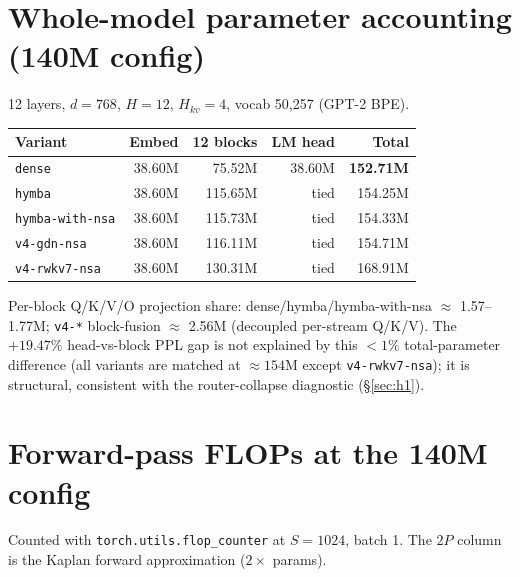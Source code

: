 
\section{Whole-model parameter accounting (140M config)}
\label{app:params}
12 layers, $d{=}768$, $H{=}12$, $H_{kv}{=}4$, vocab 50{,}257 (GPT-2 BPE).

\begin{center}
\begin{tabular}{lrrrr}
\toprule
Variant & Embed & 12 blocks & LM head & Total \\
\midrule
\texttt{dense} & 38.60M & 75.52M & 38.60M & \textbf{152.71M} \\
\texttt{hymba} & 38.60M & 115.65M & tied & 154.25M \\
\texttt{hymba-with-nsa} & 38.60M & 115.73M & tied & 154.33M \\
\texttt{v4-gdn-nsa} & 38.60M & 116.11M & tied & 154.71M \\
\texttt{v4-rwkv7-nsa} & 38.60M & 130.31M & tied & 168.91M \\
\bottomrule
\end{tabular}
\end{center}

Per-block Q/K/V/O projection share: dense/hymba/hymba-with-nsa $\approx$
1.57--1.77M; \texttt{v4-*} block-fusion $\approx$ 2.56M (decoupled per-stream
Q/K/V). The $+19.47\%$ head-vs-block PPL gap is not explained by this $<1\%$
total-parameter difference (all variants are matched at $\approx154$M except
\texttt{v4-rwkv7-nsa}); it is structural, consistent with the router-collapse
diagnostic (\S\ref{sec:h1}).

\section{Forward-pass FLOPs at the 140M config}
\label{app:flops}
Counted with \texttt{torch.utils.flop\_counter} at $S{=}1024$, batch 1.
The $2P$ column is the Kaplan forward approximation ($2\times$ params).

